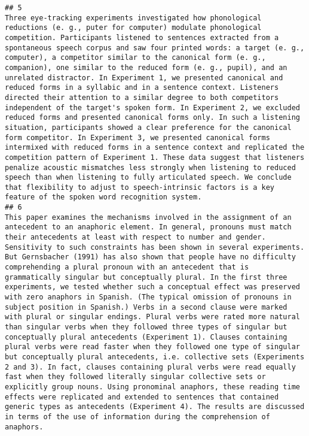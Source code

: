 \documentclass[cm]{glossa}
\begin{document}
\begin{verbatim}
## 5                                                                                                                                                                                                                                                                                                                                                                                               Three eye-tracking experiments investigated how phonological reductions (e. g., puter for computer) modulate phonological competition. Participants listened to sentences extracted from a spontaneous speech corpus and saw four printed words: a target (e. g., computer), a competitor similar to the canonical form (e. g., companion), one similar to the reduced form (e. g., pupil), and an unrelated distractor. In Experiment 1, we presented canonical and reduced forms in a syllabic and in a sentence context. Listeners directed their attention to a similar degree to both competitors independent of the target's spoken form. In Experiment 2, we excluded reduced forms and presented canonical forms only. In such a listening situation, participants showed a clear preference for the canonical form competitor. In Experiment 3, we presented canonical forms intermixed with reduced forms in a sentence context and replicated the competition pattern of Experiment 1. These data suggest that listeners penalize acoustic mismatches less strongly when listening to reduced speech than when listening to fully articulated speech. We conclude that flexibility to adjust to speech-intrinsic factors is a key feature of the spoken word recognition system.
## 6                                                                                                                                                                                                            This paper examines the mechanisms involved in the assignment of an antecedent to an anaphoric element. In general, pronouns must match their antecedents at least with respect to number and gender. Sensitivity to such constraints has been shown in several experiments. But Gernsbacher (1991) has also shown that people have no difficulty comprehending a plural pronoun with an antecedent that is grammatically singular but conceptually plural. In the first three experiments, we tested whether such a conceptual effect was preserved with zero anaphors in Spanish. (The typical omission of pronouns in subject position in Spanish.) Verbs in a second clause were marked with plural or singular endings. Plural verbs were rated more natural than singular verbs when they followed three types of singular but conceptually plural antecedents (Experiment 1). Clauses containing plural verbs were read faster when they followed one type of singular but conceptually plural antecedents, i.e. collective sets (Experiments 2 and 3). In fact, clauses containing plural verbs were read equally fast when they followed literally singular collective sets or explicitly group nouns. Using pronominal anaphors, these reading time effects were replicated and extended to sentences that contained generic types as antecedents (Experiment 4). The results are discussed in terms of the use of information during the comprehension of anaphors.

\end{verbatim}
\end{document}
